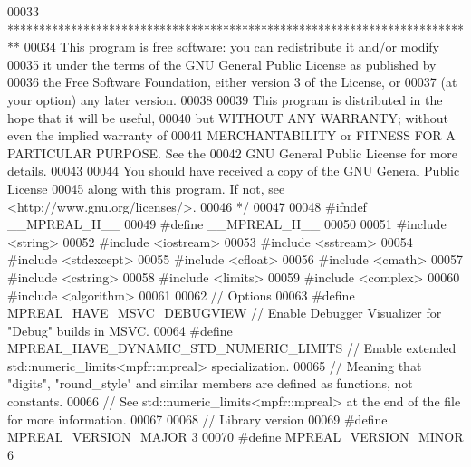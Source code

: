 \begin{DoxyCode}
00033 \textcolor{comment}{    **************************************************************************}
00034 \textcolor{comment}{    This program is free software: you can redistribute it and/or modify}
00035 \textcolor{comment}{    it under the terms of the GNU General Public License as published by}
00036 \textcolor{comment}{    the Free Software Foundation, either version 3 of the License, or}
00037 \textcolor{comment}{    (at your option) any later version.}
00038 \textcolor{comment}{}
00039 \textcolor{comment}{    This program is distributed in the hope that it will be useful,}
00040 \textcolor{comment}{    but WITHOUT ANY WARRANTY; without even the implied warranty of}
00041 \textcolor{comment}{    MERCHANTABILITY or FITNESS FOR A PARTICULAR PURPOSE.  See the}
00042 \textcolor{comment}{    GNU General Public License for more details.}
00043 \textcolor{comment}{}
00044 \textcolor{comment}{    You should have received a copy of the GNU General Public License}
00045 \textcolor{comment}{    along with this program.  If not, see <http://www.gnu.org/licenses/>.}
00046 \textcolor{comment}{*/}
00047 
00048 \textcolor{preprocessor}{#ifndef \_\_MPREAL\_H\_\_}
00049 \textcolor{preprocessor}{#define \_\_MPREAL\_H\_\_}
00050 
00051 \textcolor{preprocessor}{#include <string>}
00052 \textcolor{preprocessor}{#include <iostream>}
00053 \textcolor{preprocessor}{#include <sstream>}
00054 \textcolor{preprocessor}{#include <stdexcept>}
00055 \textcolor{preprocessor}{#include <cfloat>}
00056 \textcolor{preprocessor}{#include <cmath>}
00057 \textcolor{preprocessor}{#include <cstring>}
00058 \textcolor{preprocessor}{#include <limits>}
00059 \textcolor{preprocessor}{#include <complex>}
00060 \textcolor{preprocessor}{#include <algorithm>}
00061 
00062 \textcolor{comment}{// Options}
00063 \textcolor{preprocessor}{#define MPREAL\_HAVE\_MSVC\_DEBUGVIEW              // Enable Debugger Visualizer for "Debug" builds in MSVC.}
00064 \textcolor{preprocessor}{#define MPREAL\_HAVE\_DYNAMIC\_STD\_NUMERIC\_LIMITS  // Enable extended std::numeric\_limits<mpfr::mpreal>
       specialization.}
00065                                                 \textcolor{comment}{// Meaning that "digits", "round\_style" and similar members
       are defined as functions, not constants.}
00066                                                 \textcolor{comment}{// See std::numeric\_limits<mpfr::mpreal> at the end of the
       file for more information.}
00067 
00068 \textcolor{comment}{// Library version}
00069 \textcolor{preprocessor}{#define MPREAL\_VERSION\_MAJOR 3}
00070 \textcolor{preprocessor}{#define MPREAL\_VERSION\_MINOR 6}

\end{DoxyCode}
